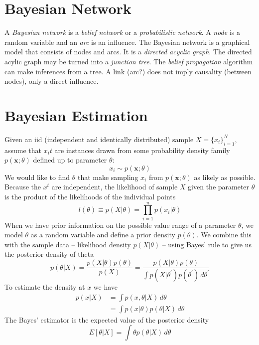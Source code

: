 \documentclass{article}
\begin{document}
	\section{Bayesian Network}
		A \emph{Bayesian network} is a \emph{belief network} or a \emph{probabilistic network}. A \emph{node} is a random variable and an \emph{arc} is an influence. The Bayesian network is a graphical model that consists of nodes and arcs. It is a \emph{directed acyclic graph}. The directed acylic graph may be turned into a \emph{junction tree}. The \emph{belief propagation} algorithm can make inferences from a tree. A link (arc?) does not imply causality (between nodes), only a direct influence.\\
	\section{Bayesian Estimation}
		Given an iid (independent and identically distributed) sample $X=\{x_i\}_{i=1}^N$, assume that $x_it$ are instances drawn from some probability density family $p(\mathbf{x};\theta)$ defined up to parameter $\theta$:
		\begin{equation}
			x_i\sim p(\mathbf{x};\theta)
		\end{equation}
		We would like to find $\theta$ that make sampling $x_i$ from $p(\mathbf{x};\theta)$ as likely as possible. Because the $x^t$ are independent, the likelihood of sample $X$ given the parameter $\theta$ is the product of the likelihoods of the individual points
		\begin{equation}
			l(\theta)\equiv p(X|\theta)=\prod_{i=1}^n{p(x_i|\theta)}
		\end{equation}
		When we have prior information on the possible value range of a parameter $\theta$, we model $\theta$ as a random variable and define a prior density $p(\theta)$. We combine this with the sample data -- likelihood density $p(X|\theta)$ -- using Bayes' rule to give us the posterior density of theta
		\begin{equation}
			p(\theta|X)=\frac{p(X|\theta)p(\theta)}{p(X)}=\frac{p(X|\theta)p(\theta)}{\int{p(X|\theta^\prime)p(\theta^\prime)\,d\theta^\prime}}
		\end{equation}
		To estimate the density at $x$ we have
		\begin{align*}
			p(x|X)&=\int{p(x,\theta|X)\,d\theta}\\
			&=\int{p(x|\theta)p(\theta|X)\,d\theta}
		\end{align*}
		The Bayes' estimator is the expected value of the posterior density
		\begin{equation}
			E[\theta|X]=\int{\theta p(\theta|X)\,d\theta}
		\end{equation}
\end{document}
